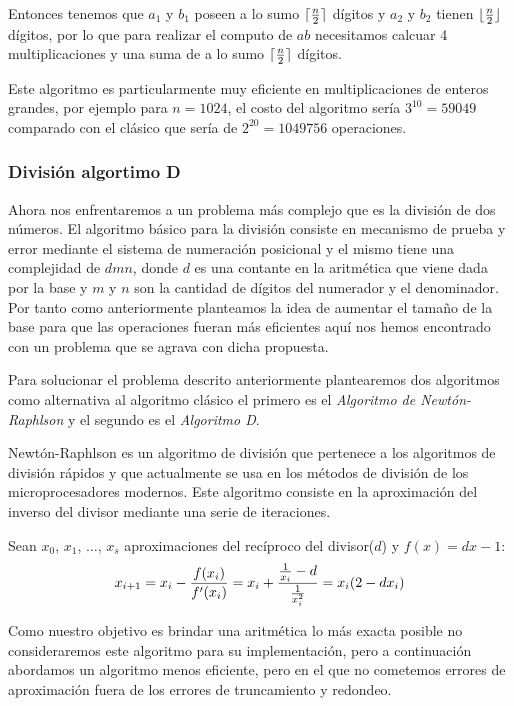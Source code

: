 \documentclass[a4paper,10pt,twocolumn]{article}
\begin{document}
Entonces tenemos que $a_1$ y $b_1$ poseen a lo sumo $\lceil {n\over 2}\rceil$ dígitos y $a_2$ y $b_2$ tienen $\lfloor {n\over 2}\rfloor$ dígitos, por lo que para realizar el computo de $ab$ necesitamos calcuar 4 multiplicaciones y una suma de a lo sumo $\lceil {n\over 2}\rceil$ dígitos.

Este algoritmo es particularmente muy eficiente en multiplicaciones de enteros grandes, por ejemplo para $n=1024$, el costo del algoritmo sería $3^{10}=59049$ comparado con el clásico que sería de $2^{20}=1049756$ operaciones. 


\subsubsection{División algortimo D}\label{sub:division}
Ahora nos enfrentaremos a un problema más complejo que es la división de dos números. El algoritmo básico para la división consiste en mecanismo de prueba y error mediante el sistema de numeración posicional y el mismo tiene una complejidad de $d m n$, donde $d$ es una contante en la aritmética que viene dada por la base y $m$ y $n$ son la cantidad de dígitos del numerador y el denominador. Por tanto como anteriormente planteamos la idea de aumentar el tamaño de la base para que las operaciones fueran más eficientes aquí nos hemos encontrado con un problema que se agrava con dicha propuesta.

Para solucionar el problema descrito anteriormente plantearemos dos algoritmos como alternativa al algoritmo clásico el primero es el \emph{Algoritmo de Newtón-Raphlson} y el segundo es el \emph{Algoritmo D}.

Newtón-Raphlson es un algoritmo de división que pertenece a los algoritmos de división rápidos y que actualmente se usa en los métodos de división de los microprocesadores modernos. Este algoritmo consiste en la aproximación del inverso del divisor mediante una serie de iteraciones.

Sean $x_0$, $x_1$, $\ldots$, $x_s$ aproximaciones del recíproco del divisor($d$) y $f(x)=dx-1$:
\begin{equation}
	x_{i+1}=x_i-{f(x_i)\over f'(x_i)}=x_i+{{1\over x_i}-d\over{1\over x^2_i}} =x_i(2-dx_i)
\end{equation}

Como nuestro objetivo es brindar una aritmética lo más exacta posible no consideraremos este algoritmo para su implementación, pero a continuación abordamos un algoritmo menos eficiente, pero en el que no cometemos errores de aproximación fuera de los errores de truncamiento y redondeo.
\end{document}
